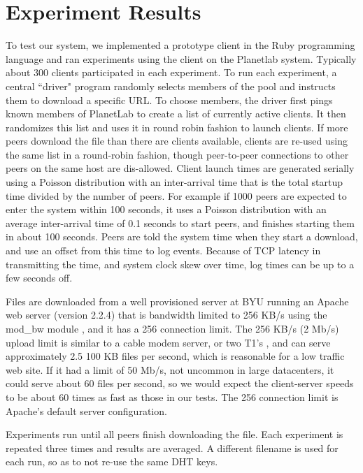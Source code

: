
\chapter{Experiment Results}

To test our system, we implemented a prototype client in the Ruby programming language and 
ran experiments using the client on the Planetlab system.  Typically about 300 clients participated in each experiment.
To run each experiment, a central ``driver" program randomly selects members of the pool and instructs them to download a specific URL.  To
choose members, the driver first pings known members of PlanetLab to create a list of currently active clients.  
It then randomizes this list and uses it in round robin fashion to launch clients.  If more peers download the file than there are clients available, clients are re-used using the same list in a round-robin fashion, though peer-to-peer connections 
to other peers on the same host are dis-allowed. 
Client launch times are generated serially using a Poisson distribution with an inter-arrival time that is the total startup time
divided by the number of peers.  For example if 1000 peers are expected to enter the system within 100 seconds, it uses a Poisson distribution with 
an average inter-arrival time of 0.1 seconds to start peers, and finishes
starting them in about 100 seconds.  Peers are told the system time when they start a download, 
and use an offset from this time to log events.  Because of TCP latency in transmitting the time, and system clock skew over time, 
log times can be up to a few seconds off.

Files are downloaded from a well provisioned server at BYU running an Apache web server (version 2.2.4) that is
bandwidth limited to 256 KB/s using the mod\_bw module \cite{mod_bw}, and it has a 256 connection limit.
The 256 KB/s (2 Mb/s) upload limit is similar to a cable modem server, or
two T1's \cite{comcast}, and can serve approximately 2.5 100 KB files per second, which is reasonable for a low traffic web site.
If it had a limit of 50 Mb/s, not uncommon in large datacenters, it could serve about 60 files per second, 
so we would expect the client-server speeds to be about 60 times as fast as those in our tests.
The 256 connection limit is Apache's default server configuration.

Experiments run until all peers finish downloading the file. 
Each experiment is repeated three times and results are averaged.  A different filename is used for each run, so as to not re-use the same DHT keys.


